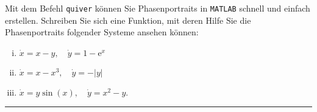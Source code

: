 \documentclass[11pt,a4paper]{article}
\begin{document}
\bigskip%

\begin{aufg}[Phasenportrait]
Mit dem Befehl \texttt{quiver} können Sie Phasenportraits in \texttt{MATLAB} schnell
und einfach erstellen. Schreiben Sie sich eine Funktion, mit deren Hilfe Sie
die Phasenportraits folgender Systeme ansehen können:
 \begin{enumerate}[(i)]
  \item $\dot{x} = x-y, \quad \dot{y} = 1 - \mathrm{e}^x$
  \item $\dot{x} = x-x^3, \quad \dot{y} = -|y|$
  \item $\dot{x} = y \sin(x), \quad \dot{y} = x^2 - y$.
 \end{enumerate}
\end{aufg}




\bigskip
\hrule

\end{document}

